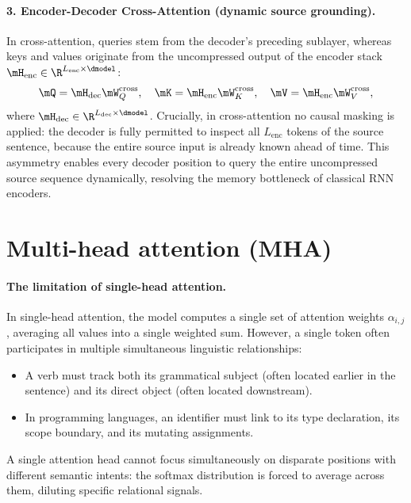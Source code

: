 \documentclass[../../main.tex]{subfiles}
\begin{document}
\paragraph{3. Encoder-Decoder Cross-Attention (dynamic source grounding).}
In cross-attention, queries stem from the decoder's preceding sublayer, whereas keys and values originate from the uncompressed output of the encoder stack $\mH_{\text{enc}} \in \R^{L_{\text{enc}} \times \dmodel}$:
\begin{equation}
\label{eq:cross_attention_projections}
\mQ = \mH_{\text{dec}} \mW_Q^{\text{cross}}, \quad \mK = \mH_{\text{enc}} \mW_K^{\text{cross}}, \quad \mV = \mH_{\text{enc}} \mW_V^{\text{cross}},
\end{equation}
where $\mH_{\text{dec}} \in \R^{L_{\text{dec}} \times \dmodel}$.
Crucially, in cross-attention no causal masking is applied: the decoder is fully permitted to inspect all $L_{\text{enc}}$ tokens of the source sentence, because the entire source input is already known ahead of time. This asymmetry enables every decoder position to query the entire uncompressed source sequence dynamically, resolving the memory bottleneck of classical RNN encoders.

\section{Multi-head attention (MHA)}
\label{sec:multi_head_attention}

\paragraph{The limitation of single-head attention.}
In single-head attention, the model computes a single set of attention weights $\alpha_{i, j}$, averaging all values into a single weighted sum. However, a single token often participates in multiple simultaneous linguistic relationships:
\begin{itemize}
    \item A verb must track both its grammatical subject (often located earlier in the sentence) and its direct object (often located downstream).
    \item In programming languages, an identifier must link to its type declaration, its scope boundary, and its mutating assignments.
\end{itemize}
A single attention head cannot focus simultaneously on disparate positions with different semantic intents: the softmax distribution is forced to average across them, diluting specific relational signals.
\end{document}

